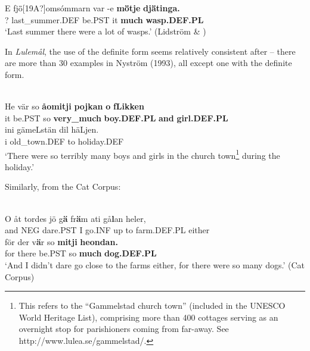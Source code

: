 \z

\ea
\gll E  fj\={ö}[19A?]omsómmarn  var  {}-e  \textbf{m\={ö}tje} \textbf{  dj\={ä}tinga.}\\
?  last\_summer.DEF  be.PST  it  \textbf{much} \textbf{wasp.DEF.PL}\\
\glt ‘Last summer there were a lot of wasps.’ (Lidström \& \citet[93]{Berglund1991})

\z

In \textit{Lulemål}, the use of the definite form seems relatively consistent after  – there are more than 30 examples in Nyström (1993), all except one with the definite form. 


\ea \label{} 
\\
\gll He  vär  so  \textbf{åomitji} \textbf{pojkan} \textbf{o} \textbf{fLikken}\\
it  be.PST  so  \textbf{very\_much} \textbf{boy.DEF.PL} \textbf{and} \textbf{girl.DEF.PL}\\
\gll ini  gämeLstän  dil  häLjen.\\
i  old\_town.DEF  to  holiday.DEF\\
\glt ‘There were so terribly many boys and girls in the church town\footnote{ This refers to the “Gammelstad church town” (included in the UNESCO World Heritage List), comprising more than 400 cottages serving as an overnight stop for parishioners coming from far-away. See http://www.lulea.se/gammelstad/.} during the holiday.’

\z

Similarly, from the Cat Corpus:


\ea \label{} 
\\
\gll O  åt  tordes  jö  g\textbf{ä}  fr\textbf{ä}m  ati  gå\textbf{l}an  heler,\\
and  NEG  dare.PST  I  go.INF  up  to  farm.DEF.PL  either\\
\gll för  der  v\textbf{ä}r  so  \textbf{mitji} \textbf{  heondan.}\\
for  there  be.PST  so  \textbf{much} \textbf{dog.DEF.PL}\\
\glt ‘And I didn’t dare go close to the farms either, for there were so many dogs.’ (Cat Corpus)

